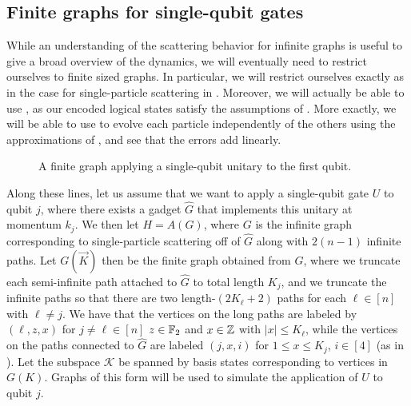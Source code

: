 \documentclass[../thesis-main/thesis-main]{subfiles}
\begin{document}
\subsection{Finite graphs for single-qubit gates}

While an understanding of the scattering behavior for infinite graphs is useful to give a broad overview of the dynamics, we will eventually need to restrict ourselves to finite sized graphs.  In particular, we will restrict ourselves exactly as in the case for single-particle scattering in .  Moreover, we will actually be able to use , as our encoded logical states satisfy the assumptions of .  More exactly, we will be able to use  to evolve each particle independently of the others using the approximations of , and see that the errors add linearly.

\begin{figure}
  \centering  
  
  \caption{A finite graph applying a single-qubit unitary to the first qubit.}
\label{fig:MP_u_sqf}
\end{figure}


Along these lines, let us assume that we want to apply a single-qubit gate $U$ to qubit $j$, where there exists a gadget $\widehat{G}$ that implements this unitary at momentum $k_j$.  We then let $H = A(G)$, where $G$ is the infinite graph corresponding to single-particle scattering off of $\widehat{G}$ along with $2(n-1)$ infinite paths.  Let $G(\vec{K})$ then be the finite graph obtained from $G$, where we truncate each semi-infinite path attached to $\widehat{G}$ to total length $K_j$, and we truncate the infinite paths so that there are two length-$(2K_\ell+2)$ paths for each $\ell\in [n]$ with $\ell\neq j$.  We have that the vertices on the long paths are labeled by $(\ell,z,x)$ for $j\neq\ell\in [n]$ $z\in \mathbb{F}_2$ and $x\in \mathbb{Z}$ with $|x| \leq K_\ell$, while the vertices on the paths connected to $\widehat{G}$ are labeled $(j,x,i)$ for $1\leq x \leq K_j$, $i\in [4]$ (as in ).  Let the subspace $\mathcal{K}$ be spanned by basis states corresponding to vertices in $G(K)$.  Graphs of this form will be used to simulate the application of $U$ to qubit $j$.
\end{document}
